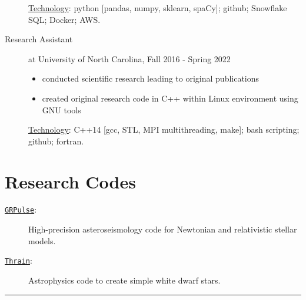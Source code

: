 \documentclass[11pt, letter]{article}
\begin{document}
\begin{minipage}{\textwidth}
\begin{description}
		\underline{Technology}: 
		python [pandas, numpy, sklearn, spaCy]; github; Snowflake SQL; Docker; AWS.
	\item[Research Assistant] at University of North Carolina, Fall 2016 - Spring 2022
		\vspace{-0.5\baselineskip}
		\begin{itemize}
			\item conducted scientific research leading to original publications
			\item created original research code in C++ within Linux environment using GNU tools
		\end{itemize}
		\vspace{-0.5\baselineskip}
		\underline{Technology}: 
		C++14 [gcc, STL, MPI multithreading, make]; bash scripting; github; fortran.
		\vspace{-0.5\baselineskip}
	\end{description}
\end{minipage}

\section*{Research Codes}
\begin{minipage}{\textwidth}
	\begin{description}
		\item[\href{https://github.com/rboston628/grpulse}{\tt GRPulse}:] High-precision asteroseismology code for Newtonian and relativistic stellar models.			
		\item[\href{https://github.com/rboston628/thrain}{\tt Thrain}:] Astrophysics code to create simple white dwarf stars.
	\end{description}
\hrule
\end{minipage}
\end{document}
